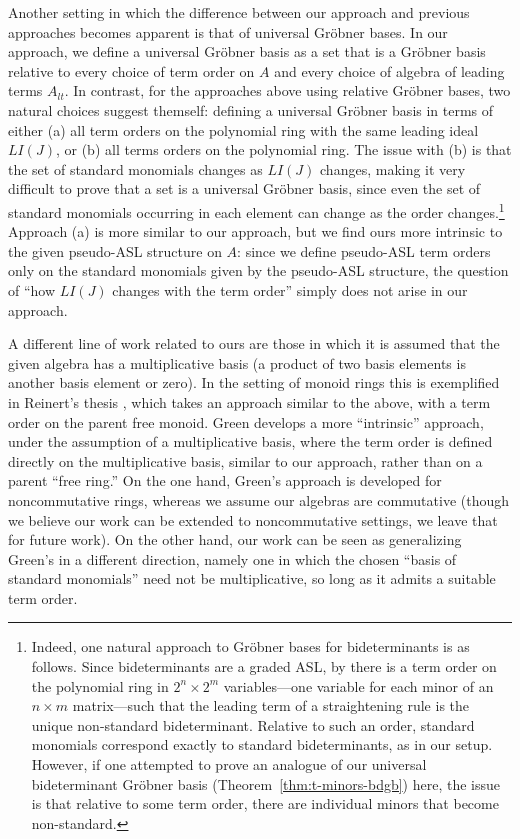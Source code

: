 \documentclass[11pt,reqno]{amsart}
\newcommand{\gb}{Gr\"{o}bner }
\theoremstyle{definition}
\numberwithin{equation}{section}
\begin{document}
Another setting in which the difference between our approach and previous approaches becomes apparent is that of universal Gröbner bases. In our approach, we define a universal Gröbner basis as a set that is a Gröbner basis relative to every choice of term order on $A$ and every choice of algebra of leading terms $A_{lt}$. In contrast, for the approaches above using relative \gb bases, two natural choices suggest themself: defining a universal Gröbner basis in terms of either (a) all term orders on the polynomial ring with the same leading ideal $LI(J)$, or (b) all terms orders on the polynomial ring. The issue with (b) is that the set of standard monomials changes as $LI(J)$ changes, making it very difficult to prove that a set is a universal Gröbner basis, since even the set of standard monomials occurring in each element can change as the order changes.\footnote{Indeed, one natural approach to Gröbner bases for bideterminants is as follows. Since bideterminants are a graded ASL, by \cite{GrabePauer} there is a term order on the polynomial ring in $2^n \times 2^m$ variables---one variable for each minor of an $n \times m$ matrix---such that the leading term of a straightening rule is the unique non-standard bideterminant. Relative to such an order, standard monomials correspond exactly to standard bideterminants, as in our setup. However, if one attempted to prove an analogue of our universal bideterminant Gröbner basis (Theorem~\ref{thm:t-minors-bdgb}) here, the issue is that relative to some term order, there are individual minors that become non-standard.} Approach (a) is more similar to our approach, but we find ours more intrinsic to the given pseudo-ASL structure on $A$: since we define pseudo-ASL term orders only on the standard monomials given by the pseudo-ASL structure, the question of ``how $LI(J)$ changes with the term order'' simply does not arise in our approach.

A different line of work related to ours are those in which it is assumed that the given algebra has a multiplicative basis (a product of two basis elements is another basis element or zero). In the setting of monoid rings this is exemplified in Reinert's thesis \cite{reinert}, which takes an approach similar to the above, with a term order on the parent free monoid. Green \cite{green} develops a more ``intrinsic'' approach, under the assumption of a multiplicative basis, where the term order is defined directly on the multiplicative basis, similar to our approach, rather than on a parent ``free ring.'' On the one hand, Green's approach is developed for noncommutative rings, whereas we assume our algebras are commutative (though we believe our work can be extended to noncommutative settings, we leave that for future work). On the other hand, our work can be seen as generalizing Green's in a different direction, namely one in which the chosen ``basis of standard monomials'' need not be multiplicative, so long as it admits a suitable term order. 
\end{document}
